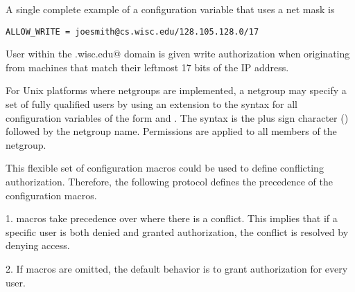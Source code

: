 A single complete example of a configuration variable that uses
a net mask is
\footnotesize
\begin{verbatim}
ALLOW_WRITE = joesmith@cs.wisc.edu/128.105.128.0/17
\end{verbatim}
\normalsize
User \verb@joesmith@ within the
\verb@cs.wisc.edu@ domain is given write authorization
when originating from machines that match their leftmost
17 bits of the IP address.

For Unix platforms where netgroups are implemented,
a netgroup may specify a set of fully qualified users by using an
extension to the syntax for all configuration variables of the form
 and .
The syntax is the plus sign character (\Expr{+}) followed by the 
netgroup name.
Permissions are applied to all members of the netgroup.

This flexible set of configuration macros could be used to define
conflicting authorization.
Therefore, the following protocol defines the precedence of the
configuration macros.
\begin{description}
\item{1. } macros take precedence over 
where there is a conflict.
This implies that if a specific user is both denied and granted authorization,
the conflict is resolved by denying access.
\item{2. }If macros are omitted, the default behavior is to grant
authorization for every user.
\end{description}

